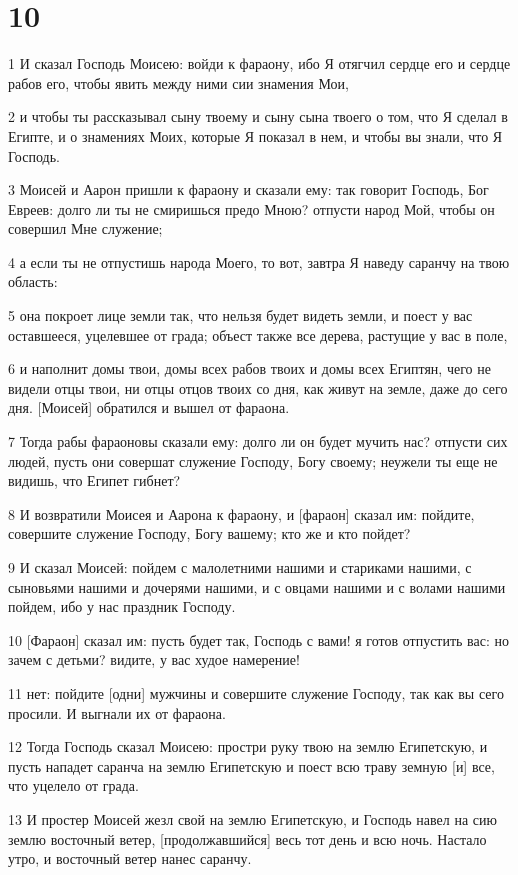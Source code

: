 \chapter{10}

\par 1 И сказал Господь Моисею: войди к фараону, ибо Я отягчил сердце его и сердце рабов его, чтобы явить между ними сии знамения Мои,
\par 2 и чтобы ты рассказывал сыну твоему и сыну сына твоего о том, что Я сделал в Египте, и о знамениях Моих, которые Я показал в нем, и чтобы вы знали, что Я Господь.
\par 3 Моисей и Аарон пришли к фараону и сказали ему: так говорит Господь, Бог Евреев: долго ли ты не смиришься предо Мною? отпусти народ Мой, чтобы он совершил Мне служение;
\par 4 а если ты не отпустишь народа Моего, то вот, завтра Я наведу саранчу на твою область:
\par 5 она покроет лице земли так, что нельзя будет видеть земли, и поест у вас оставшееся, уцелевшее от града; объест также все дерева, растущие у вас в поле,
\par 6 и наполнит домы твои, домы всех рабов твоих и домы всех Египтян, чего не видели отцы твои, ни отцы отцов твоих со дня, как живут на земле, даже до сего дня. [Моисей] обратился и вышел от фараона.
\par 7 Тогда рабы фараоновы сказали ему: долго ли он будет мучить нас? отпусти сих людей, пусть они совершат служение Господу, Богу своему; неужели ты еще не видишь, что Египет гибнет?
\par 8 И возвратили Моисея и Аарона к фараону, и [фараон] сказал им: пойдите, совершите служение Господу, Богу вашему; кто же и кто пойдет?
\par 9 И сказал Моисей: пойдем с малолетними нашими и стариками нашими, с сыновьями нашими и дочерями нашими, и с овцами нашими и с волами нашими пойдем, ибо у нас праздник Господу.
\par 10 [Фараон] сказал им: пусть будет так, Господь с вами! я готов отпустить вас: но зачем с детьми? видите, у вас худое намерение!
\par 11 нет: пойдите [одни] мужчины и совершите служение Господу, так как вы сего просили. И выгнали их от фараона.
\par 12 Тогда Господь сказал Моисею: простри руку твою на землю Египетскую, и пусть нападет саранча на землю Египетскую и поест всю траву земную [и] все, что уцелело от града.
\par 13 И простер Моисей жезл свой на землю Египетскую, и Господь навел на сию землю восточный ветер, [продолжавшийся] весь тот день и всю ночь. Настало утро, и восточный ветер нанес саранчу.
